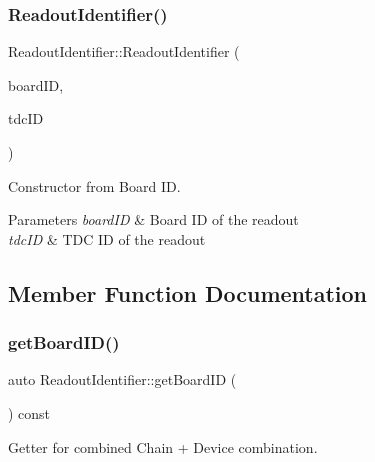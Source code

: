 \subsubsection{\texorpdfstring{Readout\+Identifier()}{ReadoutIdentifier()}}
{\footnotesize\ttfamily Readout\+Identifier\+::\+Readout\+Identifier (\begin{DoxyParamCaption}\item[{const \hyperlink{class_board_identifier}{Board\+Identifier} \&}]{board\+ID,  }\item[{const unsigned int}]{tdc\+ID }\end{DoxyParamCaption})}



Constructor from Board ID. 


\begin{DoxyParams}{Parameters}
{\em board\+ID} & Board ID of the readout \\
\hline
{\em tdc\+ID} & T\+DC ID of the readout \\
\hline
\end{DoxyParams}


\subsection{Member Function Documentation}
\mbox{\label{class_readout_identifier_ad5a9727c8ed4bd02883f6d68d0fadac8}} 
\subsubsection{\texorpdfstring{get\+Board\+I\+D()}{getBoardID()}}
{\footnotesize\ttfamily auto Readout\+Identifier\+::get\+Board\+ID (\begin{DoxyParamCaption}{ }\end{DoxyParamCaption}) const\hspace{0.3cm}{\ttfamily [inline]}}



Getter for combined Chain + Device combination. 

\mbox{\label{class_readout_identifier_a17ec929ed43ac36bf7913ba2ad316f2f}} 
